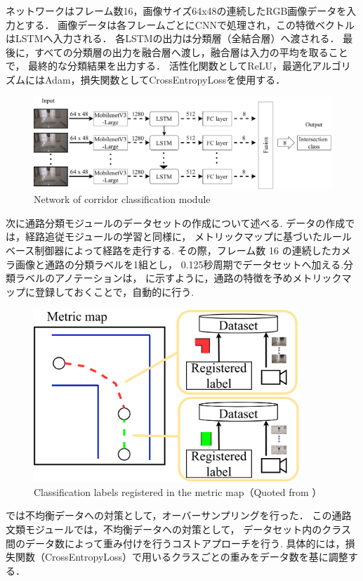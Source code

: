 ネットワークはフレーム数16，画像サイズ64x48の連続したRGB画像データを入力とする．
画像データは各フレームごとにCNNで処理され，この特徴ベクトルはLSTMへ入力される．
各LSTMの出力は分類層（全結合層）へ渡される．
最後に，すべての分類層の出力を融合層へ渡し，融合層は入力の平均を取ることで，
最終的な分類結果を出力する．
活性化関数としてReLU，最適化アルゴリズムにはAdam，損失関数としてCrossEntropyLossを使用する．
\begin{figure}[htbp]
    \centering
     \includegraphics[width=120mm]{images/pdf/network-intersect.pdf}
     \caption{Network of corridor classification module}
     \label{fig:int_net}
\end{figure}

\newpage
次に通路分類モジュールのデータセットの作成について述べる.
データの作成では，経路追従モジュールの学習と同様に，
メトリックマップに基づいたルールベース制御器によって経路を走行する.
その際，フレーム数 16 の連続したカメラ画像と通路の分類ラベルを1組とし，
0.125秒周期でデータセットへ加える.分類ラベルのアノテーションは，
に示すように，通路の特徴を予めメトリックマップに登録しておくことで，自動的に行う.
\begin{figure}[htbp]
    \centering
     \includegraphics[width=100mm]{images/pdf/map_label.pdf}
     \caption[Classification labels registered in the metric map]{Classification labels registered in the metric map（Quoted from \cite{haruyama2023}）}
     \label{fig:int_net}
\end{figure}

では不均衡データへの対策として，オーバーサンプリングを行った．
この通路文類モジュールでは，不均衡データへの対策として，
データセット内のクラス間のデータ数によって重み付けを行うコストアプローチ\cite{cost}を行う.
具体的には，損失関数（CrossEntropyLoss）で用いるクラスごとの重みをデータ数を基に調整する．